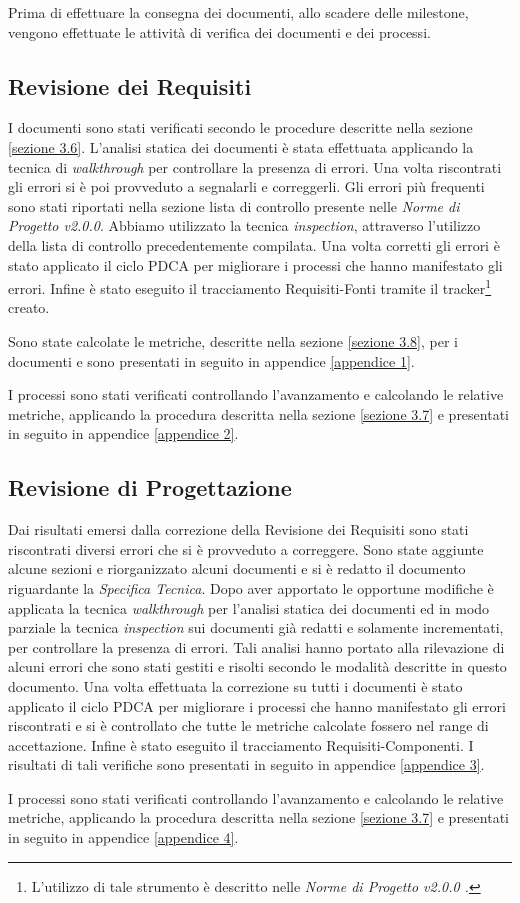 Prima di effettuare la consegna dei documenti, allo scadere delle \gls{milestone}, vengono effettuate le attività di verifica dei documenti e dei processi.

\subsection{Revisione dei Requisiti}

\noindent I documenti sono stati verificati secondo le procedure descritte nella sezione \ref{sezione 3.6}.
L'analisi statica dei documenti è stata effettuata applicando la tecnica di \textit{walkthrough} per controllare la presenza di errori. Una volta riscontrati gli errori si è poi provveduto a segnalarli e correggerli. Gli errori più frequenti sono stati riportati nella sezione lista di controllo presente nelle \textit{Norme di Progetto v2.0.0}. Abbiamo utilizzato la tecnica \textit{inspection}, attraverso l'utilizzo della lista di controllo precedentemente compilata. Una volta corretti gli errori è stato applicato il ciclo PDCA per migliorare i processi che hanno manifestato gli errori. Infine è stato eseguito il tracciamento Requisiti-Fonti tramite il tracker\footnote{L'utilizzo di tale strumento è descritto nelle \textit{Norme di Progetto v2.0.0 .}} creato. 

\noindent Sono state calcolate le metriche, descritte nella sezione \ref{sezione 3.8}, per i documenti e sono presentati in seguito in appendice \ref{appendice 1}. 

\noindent I processi sono stati verificati controllando l'avanzamento e calcolando le relative metriche, applicando la procedura descritta nella sezione \ref{sezione 3.7} e presentati in seguito in appendice \ref{appendice 2}.

\subsection{Revisione di Progettazione}

Dai risultati emersi dalla correzione della Revisione dei Requisiti sono stati riscontrati diversi errori che si è provveduto a correggere.
Sono state aggiunte alcune sezioni e riorganizzato alcuni documenti e si è redatto il documento riguardante la \textit{Specifica Tecnica}.
Dopo aver apportato le opportune modifiche è applicata la tecnica \textit{walkthrough} per l'analisi statica dei documenti ed in modo parziale la tecnica \textit{inspection} sui documenti già redatti e solamente incrementati, per controllare la presenza di errori. Tali analisi hanno portato alla rilevazione di alcuni errori che sono stati gestiti e risolti secondo le modalità descritte in questo documento. Una volta effettuata la correzione su tutti i documenti è stato applicato il ciclo PDCA per migliorare i processi che hanno manifestato gli errori riscontrati e si è controllato che tutte le metriche calcolate fossero nel range di accettazione. Infine è stato eseguito il tracciamento Requisiti-Componenti. I risultati di tali verifiche sono presentati in seguito in appendice \ref{appendice 3}.

\noindent I processi sono stati verificati controllando l'avanzamento e calcolando le relative metriche, applicando la procedura descritta nella sezione \ref{sezione 3.7} e presentati in seguito in appendice \ref{appendice 4}.

